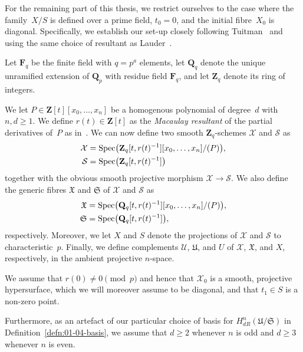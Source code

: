 For the remaining part of this thesis, we restrict ourselves to the case 
where the family~$X/S$ is defined over a prime field, $t_0 = 0$, and the 
initial fibre~$X_0$ is diagonal.  Specifically, we establish our set-up 
closely following Tuitman~\citep[\S 3.6]{Tuitman2011} and using the same 
choice of resultant as Lauder~\citep[\S 2.3.2]{Lauder2011}.

\begin{notation} \label{not:01-02-main}
Let $\mathbf{F}_q$ be the finite field with $q = p^a$ elements, 
let $\mathbf{Q}_q$ denote the unique unramified extension of $\mathbf{Q}_p$ 
with residue field $\mathbf{F}_q$, and let $\mathbf{Z}_q$ denote its 
ring of integers.

We let $P \in \mathbf{Z}[t][x_0,\dotsc,x_n]$ be a homogenous polynomial 
of degree~$d$ with $n, d \geq 1$.  We define $r(t) \in \mathbf{Z}[t]$ as 
the \emph{Macaulay resultant} of the partial derivatives of~$P$ as 
in~\citep[Page~7, Chapter~I.6]{Macaulay1994}.  We can now define two 
smooth $\mathbf{Z}_q$-schemes $\mathcal{X}$ and $\mathcal{S}$ as 
\begin{align*}
\mathcal{X} & = \operatorname{Spec}\bigl( \mathbf{Z}_q[t,r(t)^{-1}][x_0,\dotsc,x_n] / (P)\bigr), \\
\mathcal{S} & = \operatorname{Spec}\bigl( \mathbf{Z}_q[t,r(t)^{-1}] \bigr)
\end{align*}
together with the obvious smooth projective morphism 
$\mathcal{X} \to \mathcal{S}$.  We also define the generic fibres 
$\mathfrak{X}$ and $\mathfrak{S}$ of $\mathcal{X}$ and $\mathcal{S}$ as 
\begin{align*}
\mathfrak{X} & = \operatorname{Spec}\bigl( \mathbf{Q}_q[t,r(t)^{-1}][x_0,\dotsc,x_n] / (P)\bigr), \\
\mathfrak{S} & = \operatorname{Spec}\bigl( \mathbf{Q}_q[t,r(t)^{-1}] \bigr),
\end{align*}
respectively.  Moreover, we let $X$ and $S$ denote the projections 
of $\mathcal{X}$ and $\mathcal{S}$ to characteristic~$p$. 
Finally, we define complements $\mathcal{U}$, $\mathfrak{U}$, and $U$ 
of $\mathcal{X}$, $\mathfrak{X}$, and $X$, respectively, in the 
ambient projective $n$-space.

We assume that $r(0) \neq 0 \pmod{p}$ and hence that $\mathcal{X}_0$ is 
a smooth, projective hypersurface, which we will moreover assume to be 
diagonal, and that $t_1 \in S$ is a non-zero point.
\end{notation}

\begin{notation}
Furthermore, as an artefact of our particular choice of basis for 
$H_{dR}^n(\mathfrak{U}/\mathfrak{S})$ in Definition~\ref{defn:01-04-basis}, 
we assume that $d \geq 2$ whenever $n$ is odd and $d \geq 3$ whenever $n$ 
is even.
\end{notation}

